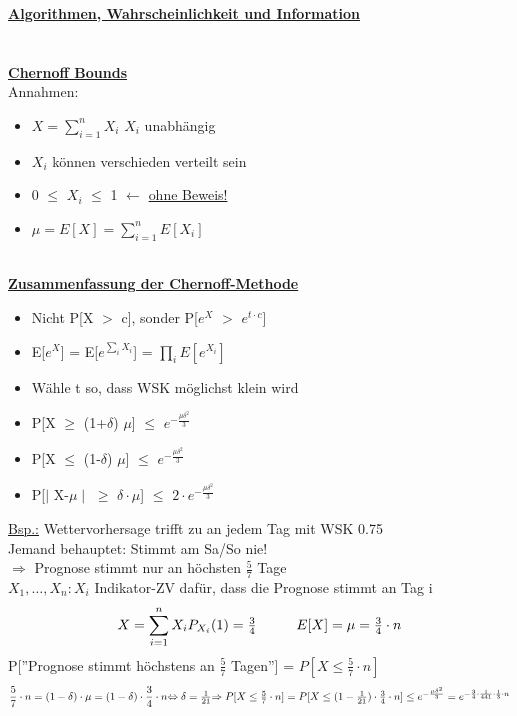 \documentclass{article}
\begin{document}
	\textbf{\underline{\large{Algorithmen, Wahrscheinlichkeit und Information}}}
	\\ \\ \\
	\underline{\textbf{Chernoff Bounds}} \\
	Annahmen:
	\begin{itemize}
		\item $X = \sum_{i=1}^n X_i$ $X_i$ unabhängig
		\item $X_i$ können verschieden verteilt sein
		\item 0 $\leq$ $X_i$ $\leq$ 1 $\leftarrow$ \underline{ohne Beweis!}
		\item $\mu = E[X] = \sum_{i=1}^n E[X_i]$
	\end{itemize}
	\hfill \\
	\underline{\textbf{Zusammenfassung der Chernoff-Methode}}
	\begin{itemize}
		\item Nicht P[X $>$ c], sonder P[$e^X$ $>$ $e^{t\cdot c}$]
		\item E[$e^X$] = E[$e^{\sum_i X_i}$] = $\prod_i E[e^{X_i}]$
		\item Wähle t so, dass WSK möglichst klein wird
	\end{itemize}
	\begin{itemize}
		\item P[X $\geq$ (1+$\delta$) $\mu$] $\leq$ $e^{-\frac{\mu \delta ^2}{3}}$
		\item P[X  $\leq$ (1-$\delta$) $\mu$] $\leq$ $e^{-\frac{\mu \delta ^2}{3}}$
		\item P[$\mid$ X-$\mu \mid$  $\geq$ $\delta \cdot \mu$] $\leq$ $2 \cdot e^{-\frac{\mu \delta ^2}{3}}$
	\end{itemize}
	\underline{Bsp.:} Wettervorhersage trifft zu an jedem Tag mit WSK 0.75 \\
	Jemand behauptet: Stimmt am Sa/So nie! \\
	$\Rightarrow$ Prognose stimmt nur an höchsten $\frac{5}{7}$ Tage \\
	$X_1, \ldots , X_n: X_i$ Indikator-ZV dafür, dass die Prognose stimmt an Tag i \\
	\[
		X = \sum_{i=1}^n X_i $$ $$
		P_{X_i} (1) = \frac{3}{4} \hspace{1cm} E[X] = \mu = \frac{3}{4} \cdot n
	\]
	P[''Prognose stimmt höchstens an $\frac{5}{7}$ Tagen''] = $P[X\leq \frac{5}{7} \cdot n]$ \\
	\[
		\frac{5}{7} \cdot n = (1-\delta ) \cdot \mu = (1-\delta ) \cdot \frac{3}{4} \cdot n $$ $$
		\Leftrightarrow \delta = \frac{1}{21} $$ $$
		\Rightarrow P[X\leq \frac{5}{7} \cdot n] = P[X \leq (1-\frac{1}{21}) \cdot \frac{3}{4} \cdot n] \leq e^{-\frac{\mu \delta ^2}{3}} = e^{-\frac{3}{4} \cdot \frac{1}{441} \cdot \frac{1}{3} \cdot n}
	\]
\end{document}
